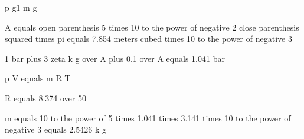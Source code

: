 p g1 m g

A equals open parenthesis 5 times 10 to the power of negative 2 close parenthesis squared times pi equals 7.854 meters cubed times 10 to the power of negative 3

1 bar plus 3 zeta k g over A plus 0.1 over A equals 1.041 bar

p V equals m R T

R equals 8.374 over 50

m equals 10 to the power of 5 times 1.041 times 3.141 times 10 to the power of negative 3 equals 2.5426 k g